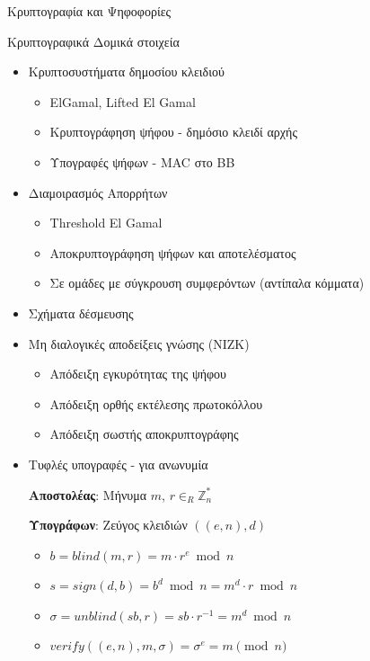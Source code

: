\documentclass[handout]{beamer}
\begin{document}
\begin{section}{Κρυπτογραφία και Ψηφοφορίες}
\begin{frame}[allowframebreaks]{Κρυπτογραφικά Δομικά στοιχεία}
  
\begin{itemize}
    \item Κρυπτοσυστήματα δημοσίου κλειδιού
    \begin{itemize}
        \item ElGamal, Lifted El Gamal
        \item Κρυπτογράφηση ψήφου - δημόσιο κλειδί αρχής
        \item Υπογραφές ψήφων - MAC στο BB
    \end{itemize} 
    \item Διαμοιρασμός Απορρήτων
    \begin{itemize}
        \item Threshold El Gamal
        \item Αποκρυπτογράφηση ψήφων και αποτελέσματος
        \item Σε ομάδες με σύγκρουση συμφερόντων (αντίπαλα κόμματα)
    \end{itemize} 
    \item Σχήματα δέσμευσης 
    \framebreak
    \item Μη διαλογικές αποδείξεις γνώσης (NIZK) 
    \begin{itemize}
        \item Απόδειξη εγκυρότητας της ψήφου
        \item Απόδειξη ορθής εκτέλεσης πρωτοκόλλου
        \item Απόδειξη σωστής αποκρυπτογράφης
    \end{itemize} 
    \item Τυφλές υπογραφές - για ανωνυμία 
    

\textbf{Αποστολέας}: Μήνυμα $m$, $r \in_R \mathbb{Z}_n^*$

\textbf{Υπογράφων}: Ζεύγος κλειδιών $((e,n), d)$

\begin{itemize}  \setlength\itemsep{.1em}
\item $b=blind(m,r) = m \cdot r^e \bmod{n}$
\item $s = sign(d,b) = b^d \bmod{n} =  m^d \cdot r \bmod{n} $
\item $\sigma = unblind(sb,r) = sb \cdot r^{-1} = m^d \bmod{n}$
\item $verify((e,n),m,\sigma) = \sigma^e = m \pmod{n}$
\end{itemize}
\end{itemize}
 

\end{frame}

\end{section} 
\end{document}
